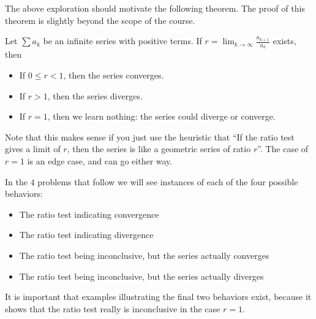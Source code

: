 \documentclass{ximera}
\begin{document}
The above exploration should motivate the following theorem.  The proof of this theorem is slightly beyond the scope of the course.

\begin{theorem}
	Let $\sum a_k$ be an infinite series with positive terms.  If $r = \lim_{k \to \infty} \frac{a_{k+1}}{a_k}$ exists, then
	
	\begin{itemize}
		\item If $0 \leq r < 1$, then the series converges.
		\item If $r>1$, then the series diverges.
		\item If $r = 1$, then we learn nothing:  the series could diverge or converge.
	\end{itemize}
\end{theorem}

Note that this makes sense if you just use the heuristic that ``If the ratio test gives a limit of $r$, then the series is like a geometric series of ratio $r$''.  The case of $r=1$ is an edge case, and can go either way.

In the $4$ problems that follow we will see instances of each of the four possible behaviors:

\begin{itemize}
	\item The ratio test indicating convergence
	\item The ratio test indicating divergence
	\item The ratio test being inconclusive, but the series actually converges
	\item The ratio test being inconclusive, but the series actually diverges
\end{itemize}

It is important that examples illustrating the final two behaviors exist, because it shows that the ratio test really is inconclusive in the case $r=1$.
\end{document}
